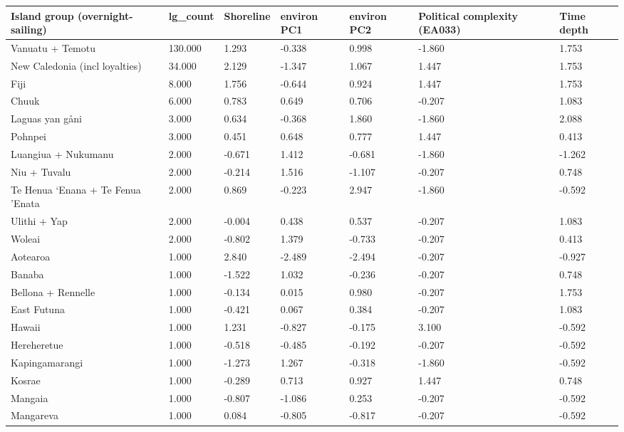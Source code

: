 \begin{longtable}{p{4.5cm}p{1.7cm}p{1.7cm}p{1.7cm}p{1.7cm}p{1.7cm}p{1.7cm}}
  \toprule
Island group (overnight-sailing) & lg_count & Shoreline & environ PC1 & environ PC2 & Political complexity (EA033) & Time depth \\ 
  \midrule
Vanuatu + Temotu & 130.000 & 1.293 & -0.338 & 0.998 & -1.860 & 1.753 \\ 
  New Caledonia (incl loyalties) & 34.000 & 2.129 & -1.347 & 1.067 & 1.447 & 1.753 \\ 
  Fiji & 8.000 & 1.756 & -0.644 & 0.924 & 1.447 & 1.753 \\ 
  Chuuk & 6.000 & 0.783 & 0.649 & 0.706 & -0.207 & 1.083 \\ 
  Laguas yan gåni & 3.000 & 0.634 & -0.368 & 1.860 & -1.860 & 2.088 \\ 
  Pohnpei & 3.000 & 0.451 & 0.648 & 0.777 & 1.447 & 0.413 \\ 
  Luangiua + Nukumanu & 2.000 & -0.671 & 1.412 & -0.681 & -1.860 & -1.262 \\ 
  Niu + Tuvalu & 2.000 & -0.214 & 1.516 & -1.107 & -0.207 & 0.748 \\ 
  Te Henua ‘Enana + Te Fenua ’Enata & 2.000 & 0.869 & -0.223 & 2.947 & -1.860 & -0.592 \\ 
  Ulithi + Yap & 2.000 & -0.004 & 0.438 & 0.537 & -0.207 & 1.083 \\ 
  Woleai & 2.000 & -0.802 & 1.379 & -0.733 & -0.207 & 0.413 \\ 
  Aotearoa & 1.000 & 2.840 & -2.489 & -2.494 & -0.207 & -0.927 \\ 
  Banaba & 1.000 & -1.522 & 1.032 & -0.236 & -0.207 & 0.748 \\ 
  Bellona + Rennelle & 1.000 & -0.134 & 0.015 & 0.980 & -0.207 & 1.753 \\ 
  East Futuna & 1.000 & -0.421 & 0.067 & 0.384 & -0.207 & 1.083 \\ 
  Hawaii & 1.000 & 1.231 & -0.827 & -0.175 & 3.100 & -0.592 \\ 
  Hereheretue & 1.000 & -0.518 & -0.485 & -0.192 & -0.207 & -0.592 \\ 
  Kapingamarangi & 1.000 & -1.273 & 1.267 & -0.318 & -1.860 & -0.592 \\ 
  Kosrae & 1.000 & -0.289 & 0.713 & 0.927 & 1.447 & 0.748 \\ 
  Mangaia & 1.000 & -0.807 & -1.086 & 0.253 & -0.207 & -0.592 \\ 
  Mangareva & 1.000 & 0.084 & -0.805 & -0.817 & -0.207 & -0.592 \\ 

\end{longtable}
